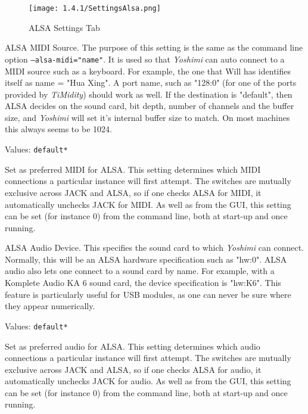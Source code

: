 \begin{figure}[H]
   \centering 
   \texttt{[image: 1.4.1/SettingsAlsa.png]}
   \caption[ALSA Settings]{ALSA Settings Tab}
   \label{fig:yoshimi_settings_alsa_tab}
\end{figure}

   \setcounter{ItemCounter}{0}      %

   ALSA MIDI Source.
   The purpose of this setting is the same as the command line option
   \texttt{--alsa-midi="name"}.
   It is used so that \textsl{Yoshimi} can auto connect to a MIDI source
   such as a keyboard.  For example, the one that Will has identifies itself
   as name = "Hua Xing".
   A port name, such as "128:0" (for one of the ports provided by
   \textsl{TiMidity}) should work as well.
   If the destination is "default",
   then ALSA decides on the sound card, bit depth, number of channels and the
   buffer size, and \textsl{Yoshimi} will set it's internal buffer size to
   match.  On most machines this always seems to be 1024.

   Values: \texttt{default*}

   Set as preferred MIDI for ALSA.
   This setting determines which MIDI connections a particular instance will
   first attempt. The switches are mutually exclusive across JACK and ALSA,
   so if one checks ALSA for MIDI, it automatically unchecks JACK for MIDI.
   As well as from the GUI, this setting can be set (for instance 0) from the
   command line, both at start-up and once running.

   ALSA Audio Device.
   This specifies the sound card to which \textsl{Yoshimi} can connect.
   Normally, this will be an ALSA hardware specification such as
   "hw:0".
   ALSA audio also lets one connect to a sound card by name. For example,
   with a Komplete Audio KA 6 sound card, the device specification is
   "hw:K6". This feature is particularly useful for USB modules, as one can
   never be sure where they appear numerically.

   Values: \texttt{default*}

   Set as preferred audio for ALSA.
   This setting determines which audio connections a particular instance will
   first attempt. The switches are mutually exclusive across JACK and ALSA,
   so if one checks ALSA for audio, it automatically unchecks JACK for audio.
   As well as from the GUI, this setting can be set (for instance 0) from the
   command line, both at start-up and once running.

